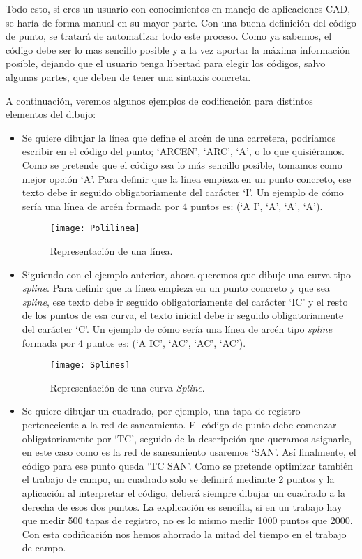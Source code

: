 Todo esto, si eres un usuario con conocimientos en manejo de aplicaciones CAD, se haría de forma manual en su mayor parte. Con una buena definición del código de punto, se tratará de automatizar todo este proceso.
Como ya sabemos, el código debe ser lo mas sencillo posible y a la vez aportar la máxima información posible, dejando que el usuario tenga libertad para elegir los códigos, salvo algunas partes, que deben de tener una sintaxis concreta. 

A continuación, veremos algunos ejemplos de codificación para distintos elementos del dibujo:

\begin{itemize}

\item Se quiere dibujar la línea que define el arcén de una carretera, podríamos escribir en el código del punto; ‘ARCEN’, ‘ARC’, ‘A’, o lo que quisiéramos. Como se pretende que el código sea lo más sencillo posible, tomamos como mejor opción ‘A’. Para definir que la línea empieza en un punto concreto, ese texto debe ir seguido obligatoriamente del carácter ‘I’. Un ejemplo de cómo sería una línea de arcén formada por 4 puntos es: (‘A I’, ‘A’, ‘A’, ‘A’).


\begin{figure}[!h]
	\centering
	\texttt{[image: Polilinea]}
	\caption{Representación de una línea.}
	\label{fig:Polilinea}
\end{figure}

\item Siguiendo con el ejemplo anterior, ahora queremos que dibuje una curva tipo \emph{spline}. Para definir que la línea empieza en un punto concreto y que sea \emph{spline}, ese texto debe ir seguido obligatoriamente del carácter ‘IC’ y el resto de los puntos de esa curva, el texto inicial debe ir seguido obligatoriamente del carácter ‘C’. Un ejemplo de cómo sería una línea de arcén tipo \emph{spline} formada por 4 puntos es: (‘A IC’, ‘AC’, ‘AC’, ‘AC’).

\begin{figure}[!h]
	\centering
	\texttt{[image: Splines]}
	\caption{Representación de una curva \emph{Spline}.}
	\label{fig:Splines}
\end{figure}

\item Se quiere dibujar un cuadrado, por ejemplo, una tapa de registro perteneciente a la red de saneamiento. El código de punto debe comenzar obligatoriamente por ‘TC’, seguido de la descripción que queramos asignarle, en este caso como es la red de saneamiento usaremos ‘SAN’. Así finalmente, el código para ese punto queda ‘TC SAN’. Como se pretende optimizar también el trabajo de campo, un cuadrado solo se definirá mediante 2 puntos y la aplicación al interpretar el código, deberá siempre dibujar un cuadrado a la derecha de esos dos puntos. La explicación es sencilla, si en un trabajo hay que medir 500 tapas de registro, no es lo mismo medir 1000 puntos que 2000. Con esta codificación nos hemos ahorrado la mitad del tiempo en el trabajo de campo.


\end{itemize}
